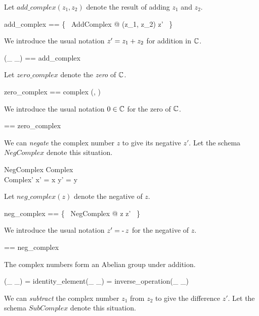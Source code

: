 \documentclass[11pt, oneside]{article}
\begin{document}
Let $add\_complex(z_1, z_2)$ denote the result of adding $z_1$ and $z_2$.

\begin{zed}
	add\_complex == \{~ AddComplex @ (z_1, z_2) \mapsto z' ~\}
\end{zed}

We introduce the usual notation $z' = z_1 \mathbin{+} z_2$ for addition in $\mathbb{C}$.

\begin{zed}
	(\_ \addC \_) == add\_complex
\end{zed}

Let $zero\_complex$ denote the \textit{zero} of $\mathbb{C}$.

\begin{zed}
	zero\_complex == complex (\zeroR, \zeroR)
\end{zed}

We introduce the usual notation $0 \in \mathbb{C}$ for the zero of $\mathbb{C}$.

\begin{zed}
	\zeroC == zero\_complex
\end{zed}

We can \textit{negate} the complex number $z$ to give its negative $z'$.
Let the schema $NegComplex$ denote this situation.

\begin{schema}{NegComplex}
	Complex \\
	Complex'
\where
	x' = \negR x
\also
	y' = \negR y
\end{schema}

Let $neg\_complex(z)$ denote the negative of $z$.

\begin{zed}
	neg\_complex == \{~ NegComplex @ z \mapsto z' ~\}
\end{zed}

We introduce the usual notation $z' = \operatorname{-} z$ for the negative of $z$.
\begin{zed}
	\negC == neg\_complex
\end{zed}

The complex numbers form an Abelian group under addition.

\begin{zed}
(\_ \addC \_) \in \abgroup \C
\also
\zeroC = identity\_element(\_ \addC \_)
\also
\negC = inverse\_operation(\_ \addC \_)
\end{zed}

We can \textit{subtract} the complex number $z_1$ from $z_2$
to give the difference $z'$.
Let the schema $SubComplex$ denote this situation.
\end{document}
